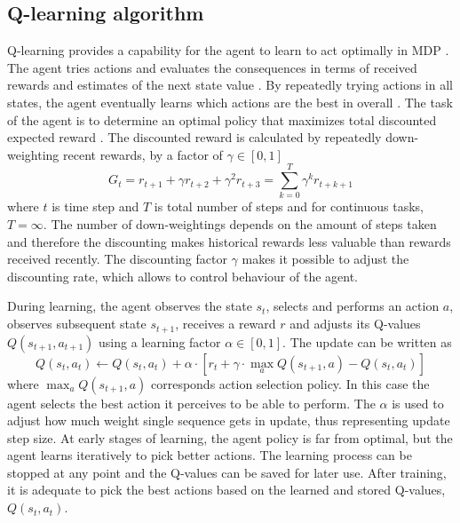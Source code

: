 
\subsection{Q-learning algorithm} %
Q-learning provides a capability for the agent to learn to act optimally in MDP \cite{RL:Watkins-Q}. The agent tries actions and evaluates the consequences in terms of received rewards and estimates of the next state value \cite{RL:Watkins-Q}. By repeatedly trying actions in all states, the agent eventually learns which actions are the best in overall \cite{RL:Watkins-Q}. The task of the agent is to determine an optimal policy that maximizes total discounted expected reward \cite{RL:Watkins-Q}. The discounted reward is calculated by repeatedly down-weighting recent rewards, by a factor of $\gamma \in [0, 1]$ \cite{RL:Sutton-Barto}
\begin{equation*}
    G_t = r_{t+1} + \gamma r_{t+2} + \gamma^2 r_{t+3} = \sum_{k=0}^{T} \gamma^k r_{t+k+1}
\end{equation*}
where $t$ is time step and $T$ is total number of steps and for continuous tasks, $T = \infty$. The number of down-weightings depends on the amount of steps taken and therefore the discounting makes historical rewards less valuable than rewards received recently. The discounting factor $\gamma$ makes it possible to adjust the discounting rate, which allows to control behaviour of the agent.

During learning, the agent observes the state $s_t$, selects and performs an action $a$, observes subsequent state $s_{t+1}$, receives a reward $r$ and adjusts its Q-values $Q(s_{t+1}, a_{t+1})$ using a learning factor $\alpha \in [0, 1]$. The update can be written as \cite{RL:Watkins-Q}
\begin{equation}
    Q(s_t, a_t) \leftarrow Q(s_t, a_t) + \alpha \cdot [r_t + \gamma \cdot \max_{a}Q(s_{t+1}, a) - Q(s_t, a_t)]
    \label{Eq:Q-learning}
\end{equation}
where $\max_{a}Q(s_{t+1}, a)$ corresponds action selection policy. In this case the agent selects the best action it perceives to be able to perform. The $\alpha$ is used to adjust how much weight single sequence gets in update, thus representing update step size. At early stages of learning, the agent policy is far from optimal, but the agent learns iteratively to pick better actions. The learning process can be stopped at any point and the Q-values can be saved for later use. After training, it is adequate to pick the best actions based on the learned and stored Q-values, $Q(s_{t}, a_{t})$.

